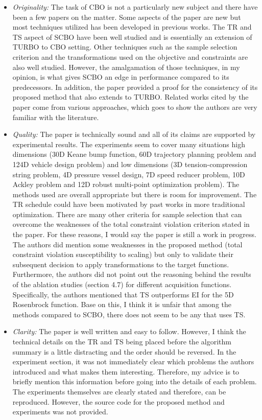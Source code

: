 \begin{itemize}
    \item \textit{Originality:} The task of CBO is not a particularly new subject and there have been a few papers on the matter. Some aspects of the paper are new but most techniques utilized has been developed in previous works. The TR and TS aspect of SCBO have been well studied and is essentially an extension of TURBO to CBO setting. Other techniques such as the sample selection criterion and the transformations used on the objective and constraints are also well studied. However, the amalgamation of those techniques, in my opinion, is what gives SCBO an edge in performance compared to its predecessors. In addition, the paper provided a proof for the consistency of its proposed method that also extends to TURBO. Related works cited by the paper come from various approaches, which goes to show the authors are very familiar with the literature.
    \item \textit{Quality:} The paper is technically sound and all of its claims are supported by experimental results. The experiments seem to cover many situations high dimensions (30D Keane bump function, 60D trajectory planning problem and 124D vehicle design problem) and low dimensions (3D tension-compression string problem, 4D pressure vessel design, 7D speed reducer problem, 10D Ackley problem and 12D robust multi-point optimization problem). The methods used are overall appropriate but there is room for improvement. The TR schedule could have been motivated by past works in more traditional optimization. There are many other criteria for sample selection that can overcome the weaknesses of the total constraint violation criterion stated in the paper. For these reasons, I would say the paper is still a work in progress. The authors did mention some weaknesses in the proposed method (total constraint violation susceptibility to scaling) but only to validate their subsequent decision to apply transformations to the target functions. Furthermore, the authors did not point out the reasoning behind the results of the ablation studies (section 4.7) for different acquisition functions. Specifically, the authors mentioned that TS outperforms EI for the 5D Rosenbrock function. Base on this, I think it is unfair that among the methods compared to SCBO, there does not seem to be any that uses TS.
    \item \textit{Clarity:} The paper is well written and easy to follow. However, I think the technical details on the TR and TS being placed before the algorithm summary is a little distracting and the order should be reversed. In the experiment section, it was not immediately clear which problems the authors introduced and what makes them interesting. Therefore, my advice is to briefly mention this information before going into the details of each problem. The experiments themselves are clearly stated and therefore, can be reproduced. However, the source code for the proposed method and experiments was not provided.

\end{itemize}
